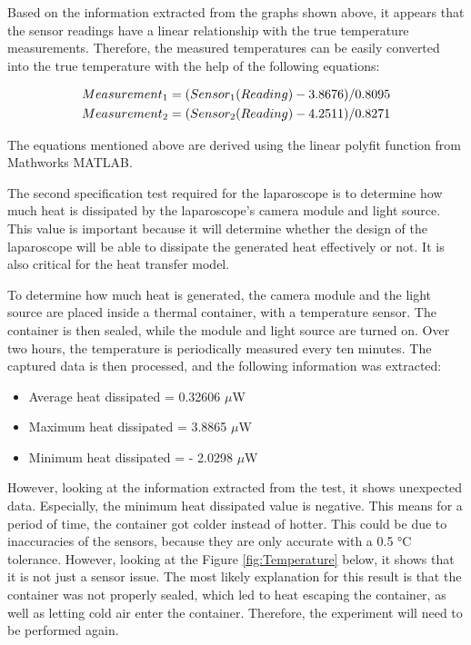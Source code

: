 Based on the information extracted from the graphs shown above, it appears that the sensor readings have a linear relationship with the true temperature measurements. Therefore, the measured temperatures can be easily converted into the true temperature with the help of the following equations:

\begin{subequations}
    \centering
    \begin{gather}
        Measurement_1 = (Sensor_1(Reading)-3.8676)/0.8095 \\
        Measurement_2 = (Sensor_2(Reading)-4.2511)/0.8271 
    \end{gather}
    
\end{subequations}

The equations mentioned above are derived using the linear polyfit function from Mathworks MATLAB.

The second specification test required for the laparoscope is to determine how much heat is dissipated by the laparoscope’s camera module and light source. This value is important because it will determine whether the design of the laparoscope will be able to dissipate the generated heat effectively or not. It is also critical for the heat transfer model.

To determine how much heat is generated, the camera module and the light source are placed inside a thermal container, with a temperature sensor. The container is then sealed, while the module and light source are turned on. Over two hours, the temperature is periodically measured every ten minutes. The captured data is then processed, and the following information was extracted:

\begin{itemize}
    \item Average heat dissipated = 0.32606 $\mu$W 
    \item Maximum heat dissipated = 3.8865 $\mu$W  
    \item Minimum heat dissipated = - 2.0298 $\mu$W  
\end{itemize}

However, looking at the information extracted from the test, it shows unexpected data. Especially, the minimum heat dissipated value is negative. This means for a period of time, the container got colder instead of hotter. This could be due to inaccuracies of the sensors, because they are only accurate with a 0.5 °C tolerance. However, looking at the Figure \ref{fig:Temperature} below, it shows that it is not just a sensor issue. The most likely explanation for this result is that the container was not properly sealed, which led to heat escaping the container, as well as letting cold air enter the container. Therefore, the experiment will need to be performed again.


